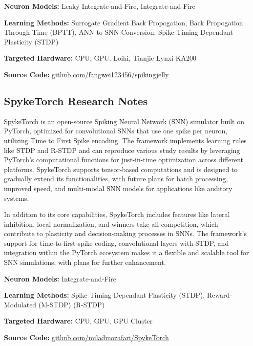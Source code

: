 \begin{tcolorbox}[enhanced,attach boxed title to top center={yshift=-3mm,yshifttext=-1mm}, colback=blue!5!white,colframe=blue!75!black,colbacktitle=red!80!black, title=SpikingJelly at a Glance,fonttitle=\bfseries, boxed title style={size=small,colframe=red!50!black} ]

\textbf{Neuron Models:} Leaky Integrate-and-Fire, Integrate-and-Fire

\textbf{Learning Methods:} Surrogate Gradient Back Propogation, Back Propogation Through Time (BPTT), ANN-to-SNN Conversion, Spike Timing Dependant Plasticity (STDP)  

\textbf{Targeted Hardware:} CPU, GPU, Loihi, Tianjic Lynxi KA200 

\textbf{Source Code:} \href{https://github.com/fangwei123456/spikingjelly}{github.com/fangwei123456/spikingjelly}
\end{tcolorbox}
\subsection*{SpykeTorch Research Notes}\label{SpykeTorch}

SpykeTorch is an open-source Spiking Neural Network (SNN) simulator built on PyTorch, optimized for convolutional SNNs that use one spike per neuron, utilizing Time to First Spike encoding. The framework implements learning rules like STDP and R-STDP and can reproduce various study results by leveraging PyTorch’s computational functions for just-in-time optimization across different platforms. SpykeTorch supports tensor-based computations and is designed to gradually extend its functionalities, with future plans for batch processing, improved speed, and multi-modal SNN models for applications like auditory systems.

In addition to its core capabilities, SpykeTorch includes features like lateral inhibition, local normalization, and winners-take-all competition, which contribute to plasticity and decision-making processes in SNNs. The framework’s support for time-to-first-spike coding, convolutional layers with STDP, and integration within the PyTorch ecosystem makes it a flexible and scalable tool for SNN simulations, with plans for further enhancement.

\begin{tcolorbox}[enhanced,attach boxed title to top center={yshift=-3mm,yshifttext=-1mm}, colback=blue!5!white,colframe=blue!75!black,colbacktitle=red!80!black, title=SpykeTorch at a Glance,fonttitle=\bfseries, boxed title style={size=small,colframe=red!50!black} ]

\textbf{Neuron Models:} Integrate-and-Fire

\textbf{Learning Methods:} Spike Timing Dependant Plasticity (STDP), Reward-Modulated (M-STDP) (R-STDP)  

\textbf{Targeted Hardware:} CPU, GPU, GPU Cluster 

\textbf{Source Code:} \href{https://github.com/miladmozafari/SpykeTorch}{github.com/miladmozafari/SpykeTorch}
\end{tcolorbox}
